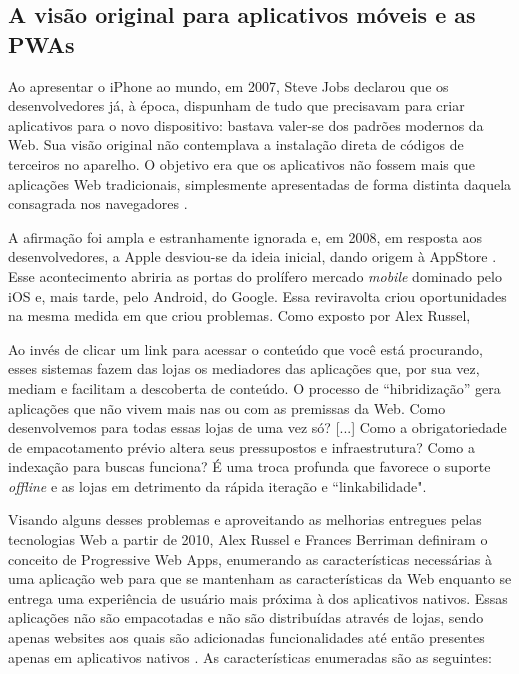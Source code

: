 \documentclass[
	article,			%
	12pt,				%
	oneside,			%
	a4paper,			%
	english,			%
	brazil,				%
	sumario=tradicional
	]{abntex2}
\begin{document}
\subsection{A visão original para aplicativos móveis e as PWAs}

Ao apresentar o iPhone ao mundo, em 2007, Steve Jobs declarou que os desenvolvedores  já, à época,  dispunham de tudo que precisavam para criar aplicativos para o novo dispositivo: bastava valer-se dos padrões modernos da Web. Sua visão original não contemplava a instalação direta de códigos de terceiros no aparelho. O objetivo era que os aplicativos não fossem mais que aplicações Web tradicionais, simplesmente apresentadas de forma distinta daquela consagrada nos navegadores \cite{9to5-2011}.

A afirmação foi ampla e estranhamente ignorada e, em 2008, em resposta aos desenvolvedores, a Apple desviou-se da ideia inicial, dando origem à AppStore \cite{9to5-2011}. Esse acontecimento abriria as portas do prolífero mercado \textit{mobile} dominado pelo iOS e, mais tarde, pelo Android, do Google. Essa reviravolta criou oportunidades na mesma medida em que criou problemas. Como exposto por Alex Russel,

\begin{citacao}
Ao invés de clicar um link para acessar o conteúdo que você está procurando, esses sistemas fazem das lojas os mediadores das aplicações que, por sua vez, mediam e facilitam a descoberta de conteúdo. O processo de “hibridização” gera aplicações que não vivem mais nas ou com as premissas da Web. Como desenvolvemos para todas essas lojas de uma vez só? [...] Como a obrigatoriedade de empacotamento prévio altera seus pressupostos e infraestrutura? Como a indexação para buscas funciona? É uma troca profunda que favorece o suporte \textit{offline} e as lojas em detrimento da rápida iteração e “linkabilidade". \cite[tradução nossa]{russel-2015}
\end{citacao}

Visando alguns desses problemas e aproveitando as melhorias entregues pelas tecnologias Web a partir de 2010, Alex Russel e Frances Berriman definiram o conceito de Progressive Web Apps, enumerando as características necessárias à uma aplicação web para que se mantenham as características da Web enquanto se entrega uma experiência de usuário mais próxima à dos aplicativos nativos. Essas aplicações não são empacotadas e não são distribuídas através de lojas, sendo apenas websites aos quais são adicionadas funcionalidades até então presentes apenas em aplicativos nativos \cite{russel-2015}. As características enumeradas são as seguintes:
\end{document}
